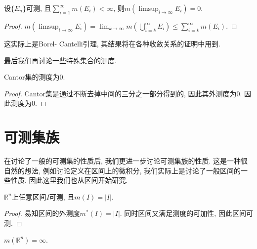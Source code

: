 \documentclass[theorem=false,mathfont=none,openany,sub3section]{easybook}
\begin{document}
\begin{corollary}
  设$\{E_n\}$可测, 且$\sum_{i=1}^{\infty}m(E_i)<\infty$, 则$m(\limsup_{i \to \infty} E_i)=0$.\par
\end{corollary}

\begin{proof}
  $m(\limsup_{i \to \infty} E_i)=\lim_{k \to \infty} m(\bigcup_{i=k}^{\infty}E_i)\leqslant \sum_{i=k}^{\infty}m(E_i)$.\par
\end{proof}

\begin{remark}
  这实际上是Borel- Cantelli引理, 其结果将在各种收敛关系的证明中用到.\par
\end{remark}

最后我们再讨论一些特殊集合的测度.\par

\begin{proposition}
  Cantor集的测度为0.\par
\end{proposition}

\begin{proof}
  Cantor集是通过不断去掉中间的三分之一部分得到的, 因此其外测度为0. 因此测度为0.\par
\end{proof}

\newpage

\section{可测集族}

在讨论了一般的可测集的性质后, 我们更进一步讨论可测集族的性质. 这是一种很自然的想法, 例如讨论定义在区间上的微积分, 我们实际上是讨论了一般区间的一些性质. 因此这里我们也从区间开始研究.\par

\begin{theorem}
  $\mathbb{R}^n$上任意区间$I$可测, 且$m(I)=|I|$.\par
\end{theorem}

\begin{proof}
  易知区间的外测度$m^{*}(I)=|I|$. 同时区间又满足测度的可加性, 因此区间可测.\par
\end{proof}

\begin{corollary}
  $m(\mathbb{R}^n)=\infty$.\par
\end{corollary}
\end{document}
